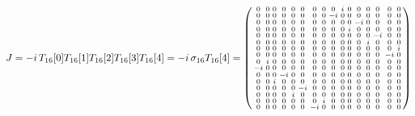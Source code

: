 \[ J = -i\,T_{16}[0]T_{16}[1]T_{16}[2]T_{16}[3]T_{16}[4] = -i\,\sigma_{16}T_{16}[4] = \setcounter{MaxMatrixCols}{16}
\left(\begin{smallmatrix}
0 & 0 & 0 & 0 & 0 & 0 & 0 & 0 & 0 & i & 0 & 0 & 0 & 0 & 0 & 0 \\
0 & 0 & 0 & 0 & 0 & 0 & 0 & 0 & -i & 0 & 0 & 0 & 0 & 0 & 0 & 0 \\
0 & 0 & 0 & 0 & 0 & 0 & 0 & 0 & 0 & 0 & 0 & -i & 0 & 0 & 0 & 0 \\
0 & 0 & 0 & 0 & 0 & 0 & 0 & 0 & 0 & 0 & i & 0 & 0 & 0 & 0 & 0 \\
0 & 0 & 0 & 0 & 0 & 0 & 0 & 0 & 0 & 0 & 0 & 0 & 0 & -i & 0 & 0 \\
0 & 0 & 0 & 0 & 0 & 0 & 0 & 0 & 0 & 0 & 0 & 0 & i & 0 & 0 & 0 \\
0 & 0 & 0 & 0 & 0 & 0 & 0 & 0 & 0 & 0 & 0 & 0 & 0 & 0 & 0 & i \\
0 & 0 & 0 & 0 & 0 & 0 & 0 & 0 & 0 & 0 & 0 & 0 & 0 & 0 & -i & 0 \\
0 & i & 0 & 0 & 0 & 0 & 0 & 0 & 0 & 0 & 0 & 0 & 0 & 0 & 0 & 0 \\
-i & 0 & 0 & 0 & 0 & 0 & 0 & 0 & 0 & 0 & 0 & 0 & 0 & 0 & 0 & 0 \\
0 & 0 & 0 & -i & 0 & 0 & 0 & 0 & 0 & 0 & 0 & 0 & 0 & 0 & 0 & 0 \\
0 & 0 & i & 0 & 0 & 0 & 0 & 0 & 0 & 0 & 0 & 0 & 0 & 0 & 0 & 0 \\
0 & 0 & 0 & 0 & 0 & -i & 0 & 0 & 0 & 0 & 0 & 0 & 0 & 0 & 0 & 0 \\
0 & 0 & 0 & 0 & i & 0 & 0 & 0 & 0 & 0 & 0 & 0 & 0 & 0 & 0 & 0 \\
0 & 0 & 0 & 0 & 0 & 0 & 0 & i & 0 & 0 & 0 & 0 & 0 & 0 & 0 & 0 \\
0 & 0 & 0 & 0 & 0 & 0 & -i & 0 & 0 & 0 & 0 & 0 & 0 & 0 & 0 & 0
\end{smallmatrix}\right) \]

